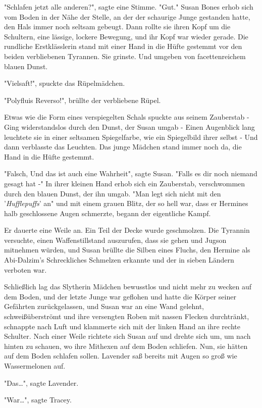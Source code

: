 {"Schlafen jetzt alle anderen?", sagte eine Stimme. "Gut." Susan Bones erhob sich vom Boden in der Nähe der Stelle, an der der schaurige Junge gestanden hatte, den Hals immer noch seltsam gebeugt. Dann rollte sie ihren Kopf um die Schultern, eine lässige, lockere Bewegung, und ihr Kopf war wieder gerade. Die rundliche Erstklässlerin stand mit einer Hand in die Hüfte gestemmt vor den beiden verbliebenen Tyrannen. Sie grinste. Und umgeben von facettenreichem blauen Dunst.

"Vielsaft!", spuckte das Rüpelmädchen.

"Polyfluis Reverso!", brüllte der verbliebene Rüpel.

Etwas wie die Form eines verspiegelten Schals spuckte aus seinem Zauberstab - Ging widerstandslos durch den Dunst, der Susan umgab - Einen Augenblick lang leuchtete sie in einer seltsamen Spiegelfarbe, wie ein Spiegelbild ihrer selbst - Und dann verblasste das Leuchten. Das junge Mädchen stand immer noch da, die Hand in die Hüfte gestemmt.

"Falsch, Und das ist auch eine Wahrheit", sagte Susan. "Falls es dir noch niemand gesagt hat -" In ihrer kleinen Hand erhob sich ein Zauberstab, verschwommen durch den blauen Dunst, der ihn umgab. "Man legt sich nicht mit den '\emph{Hufflepuffs}' an" und mit einem grauen Blitz, der so hell war, dass er Hermines halb geschlossene Augen schmerzte, begann der eigentliche Kampf.

Er dauerte eine Weile an. Ein Teil der Decke wurde geschmolzen. Die Tyrannin versuchte, einen Waffenstillstand auszurufen, dass sie gehen und Jugson mitnehmen würden, und Susan brüllte die Silben eines Fluchs, den Hermine als Abi-Dalzim's Schreckliches Schmelzen erkannte und der in sieben Ländern verboten war.

Schließlich lag das Slytherin Mädchen bewusstlos und nicht mehr zu wecken auf dem Boden, und der letzte Junge war geflohen und hatte die Körper seiner Gefährten zurückgelassen, und Susan war an eine Wand gelehnt, schweißüberströmt und ihre versengten Roben mit nassen Flecken durchtränkt, schnappte nach Luft und klammerte sich mit der linken Hand an ihre rechte Schulter. Nach einer Weile richtete sich Susan auf und drehte sich um, um nach hinten zu schauen, wo ihre Mithexen auf dem Boden schliefen. Nun, sie hätten auf dem Boden schlafen sollen. Lavender saß bereits mit Augen so groß wie Wassermelonen auf.

"Das…", sagte Lavender.

"War…", sagte Tracey.

}
